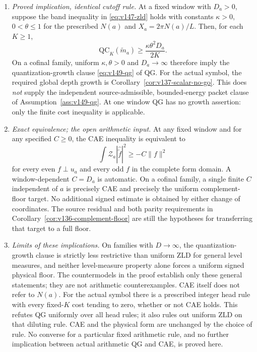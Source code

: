 \begin{proposition}
\begin{enumerate}[label=(\roman*)]
\item \emph{Proved implication, identical cutoff rule.} At a fixed
window with $D_a>0$, suppose the band inequality in
\eqref{eq:v147-zld} holds with constants $\kappa>0$, $0<\theta\le1$ for the
prescribed $N(a)$ and $X_a=2\pi N(a)/L$. Then, for each $K\ge1$,
\begin{equation}\label{eq:v151-zld-qg}
 \mathrm{QC}_K(\widetilde m_a)
       \ge\frac{\kappa\theta^2D_a}{2K}.
\end{equation}
On a cofinal family, uniform $\kappa,\theta>0$ and $D_a\to\infty$
therefore imply the quantization-growth clause
\eqref{eq:v149-qg} of QG. For the actual symbol, the required global
depth growth is Corollary~\ref{cor:v137-scalar-no-go}. This does
\emph{not} supply the independent source-admissible, bounded-energy
packet clause of Assumption~\ref{ass:v149-qg}. At one window QG
has no growth assertion: only the finite cost inequality is applicable.

\item \emph{Exact equivalence; the open arithmetic input.} At any
fixed window and for any specified $C\ge0$, the CAE inequality is
equivalent to
\begin{equation}\label{eq:v151-zero-floor}
 \int\mathcal Z_a|\widehat{\widetilde f}|^2
       \ge-C\|f\|^2
\end{equation}
for every even $f\perp u_a$ and every odd $f$ in the complete form
domain. A window-dependent $C=D_a$ is automatic. On a cofinal family,
a single finite $C$ independent of $a$ is precisely CAE and precisely
the uniform complement-floor target. No additional signed estimate is
obtained by either change of coordinates. The source residual and
both parity requirements in Corollary~\ref{cor:v136-complement-floor}
are still the hypotheses for transferring that target to a full floor.

\item \emph{Limits of these implications.} On families with $D\to\infty$, the quantization-growth clause is
strictly less restrictive than uniform ZLD for general level measures, and
neither level-measure property alone forces a uniform signed physical
floor. The countermodels in the proof establish only these general
statements; they are not arithmetic counterexamples. CAE itself does
not refer to $N(a)$. For the actual symbol there is a prescribed integer head rule with
every fixed-$K$ cost tending to zero, whether or not CAE holds. This
refutes QG uniformly over all head rules; it also rules out uniform
ZLD on that diluting rule. CAE and the physical form are unchanged
by the choice of rule. No converse for a particular fixed
arithmetic rule, and no further implication between actual arithmetic
QG and CAE, is proved here.
\end{enumerate}
\end{proposition}
